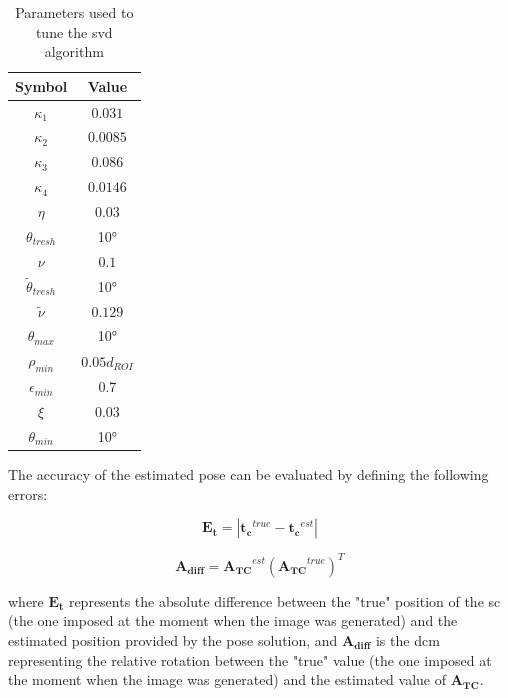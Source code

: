 \begin{table}[htbp]
  \centering
  \begin{tabular}{cc}
    \hline
    \hline
    Symbol                   & Value          \\
    \hline
    $\kappa_1$               & $0.031$        \\
    \hline
    $\kappa_2$               & $0.0085$       \\
    \hline
    $\kappa_3$               & $0.086$        \\
    \hline
    $\kappa_4$               & $0.0146$       \\
    \hline
    $\eta$                   & $0.03$         \\
    \hline
    $\theta_{tresh}$         & \ang{10}       \\
    \hline
    $\nu$                    & $0.1$          \\
    \hline
    $\tilde{\theta}_{tresh}$ & \ang{10}       \\
    \hline
    $\tilde{\nu}$            & $0.129$        \\
    \hline
    $\theta_{max}$           & \ang{10}       \\
    \hline
    $\rho_{min}$             & $0.05 d_{ROI}$ \\
    \hline
    $\epsilon_{min}$         & 0.7            \\
    \hline
    $\xi$                    & $0.03$         \\
    \hline
    $\theta_{min}$           & \ang{10}       \\
    \hline
    \hline
  \end{tabular}
  \caption{Parameters used to tune the \acrshort{svd} algorithm}
  \label{tab:svdParameters}
\end{table}

The accuracy of the estimated pose can be evaluated by defining the following errors:

\begin{equation}
  \mathbf{E_t} = |\mathbf{t_c}^{true} - \mathbf{t_c}^{est}|
\end{equation}

\begin{equation}
  \mathbf{A_{diff}} = \mathbf{A_{TC}}^{est}(\mathbf{A_{TC}}^{true})^T
\end{equation}

where $\mathbf{E_t}$ represents the absolute difference between the "true" position of the \acrshort{sc} (the one imposed at the moment when the image was generated) and the estimated position provided by the pose solution, and $\mathbf{A_{diff}}$ is the \acrshort{dcm} representing the relative rotation between the "true" value (the one imposed at the moment when the image was generated) and the estimated value of $\mathbf{A_{TC}}$.

